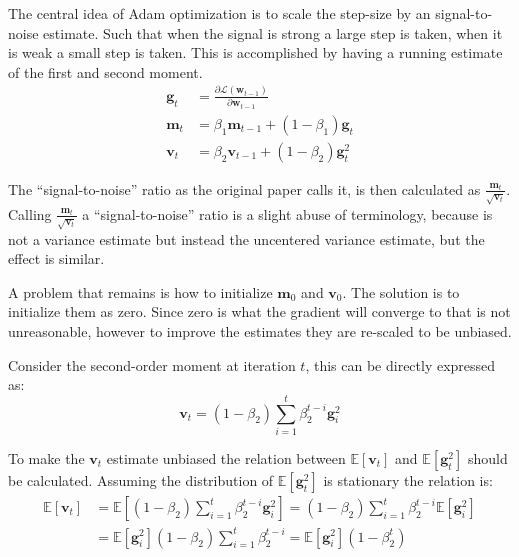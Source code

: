 The central idea of Adam optimization is to scale the step-size by an signal-to-noise estimate. Such that when the signal is strong a large step is taken, when it is weak a small step is taken. This is accomplished by having a running estimate of the first and second moment.
\begin{equation}
\begin{aligned}
\mathbf{g}_t &= \frac{\partial \mathcal{L}(\mathbf{w}_{t-1})}{\partial \mathbf{w}_{t-1}} \\
\mathbf{m}_t &= \beta_1 \mathbf{m}_{t-1} + (1 - \beta_1) \mathbf{g}_t \\
\mathbf{v}_t &= \beta_2 \mathbf{v}_{t-1} + (1 - \beta_2) \mathbf{g}_t^2
\end{aligned}
\end{equation}

The ``signal-to-noise'' ratio as the original paper \cite{adam-optimization} calls it, is then calculated as $\frac{\mathbf{m}_t}{\sqrt{\mathbf{v}_t}}$. Calling  $\frac{\mathbf{m}_t}{\sqrt{\mathbf{v}_t}}$ a ``signal-to-noise'' ratio is a slight abuse of terminology, because is not a variance estimate but instead the uncentered variance estimate, but the effect is similar.

A problem that remains is how to initialize $\mathbf{m}_{0}$ and $\mathbf{v}_{0}$. The solution is to initialize them as zero. Since zero is what the gradient will converge to that is not unreasonable, however to improve the estimates they are re-scaled to be unbiased.

Consider the second-order moment at iteration $t$, this can be directly expressed as:
\begin{equation}
\mathbf{v}_t = (1 - \beta_2)\sum_{i=1}^t \beta_2^{t-i} \mathbf{g}_{i}^2
\end{equation}

To make the $\mathbf{v}_t$ estimate unbiased the relation between $\mathbb{E}[\mathbf{v}_t]$ and $\mathbb{E}[\mathbf{g}_t^2]$ should be calculated. Assuming the distribution of $\mathbb{E}[\mathbf{g}_t^2]$ is stationary the relation is: 
\begin{equation}
\begin{aligned}
\mathbb{E}[\mathbf{v}_t] &= \mathbb{E}\left[(1 - \beta_2)\sum_{i=1}^t \beta_2^{t-i} \mathbf{g}_{i}^2\right]
= (1 - \beta_2)\sum_{i=1}^t \beta_2^{t-i} \mathbb{E}\left[\mathbf{g}_{i}^2\right] \\
&= \mathbb{E}\left[\mathbf{g}_{i}^2\right] (1 - \beta_2)\sum_{i=1}^t \beta_2^{t-i}
= \mathbb{E}\left[\mathbf{g}_{i}^2\right] (1 - \beta_2^t)
\end{aligned}
\end{equation}

